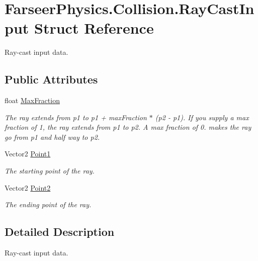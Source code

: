 \hypertarget{struct_farseer_physics_1_1_collision_1_1_ray_cast_input}{\section{Farseer\+Physics.\+Collision.\+Ray\+Cast\+Input Struct Reference}
\label{struct_farseer_physics_1_1_collision_1_1_ray_cast_input}
}


Ray-\/cast input data.  


\subsection*{Public Attributes}
\begin{DoxyCompactItemize}
\item 
float \hyperlink{struct_farseer_physics_1_1_collision_1_1_ray_cast_input_a9df5da3a4fb1c973944d5d0f00932e7e}{Max\+Fraction}
\begin{DoxyCompactList}\small\item\em The ray extends from p1 to p1 + max\+Fraction $\ast$ (p2 -\/ p1). If you supply a max fraction of 1, the ray extends from p1 to p2. A max fraction of 0. makes the ray go from p1 and half way to p2. \end{DoxyCompactList}\item 
Vector2 \hyperlink{struct_farseer_physics_1_1_collision_1_1_ray_cast_input_a083dcb06197b7e0d55051ebfbab6419e}{Point1}
\begin{DoxyCompactList}\small\item\em The starting point of the ray. \end{DoxyCompactList}\item 
Vector2 \hyperlink{struct_farseer_physics_1_1_collision_1_1_ray_cast_input_ad6e8f0beb274e23949a9a9074799731f}{Point2}
\begin{DoxyCompactList}\small\item\em The ending point of the ray. \end{DoxyCompactList}\end{DoxyCompactItemize}


\subsection{Detailed Description}
Ray-\/cast input data. 



